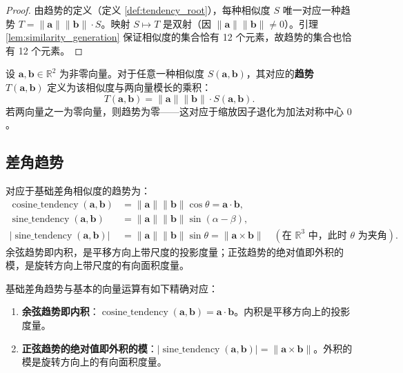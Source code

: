 \begin{proof}
由趋势的定义（定义 \ref{def:tendency_root}），每种相似度 $S$ 唯一对应一种趋势 $T = \|\mathbf{a}\|\|\mathbf{b}\| \cdot S$。映射 $S \mapsto T$ 是双射（因 $\|\mathbf{a}\|\|\mathbf{b}\| \neq 0$）。引理 \ref{lem:similarity_generation} 保证相似度的集合恰有 12 个元素，故趋势的集合也恰有 12 个元素。
\end{proof}

\begin{definition}[趋势]\label{def:tendency}
设 $\mathbf{a}, \mathbf{b} \in \mathbb{R}^2$ 为非零向量。对于任意一种相似度 $S(\mathbf{a}, \mathbf{b})$，其对应的\textbf{趋势} $T(\mathbf{a}, \mathbf{b})$ 定义为该相似度与两向量模长的乘积：
\[
T(\mathbf{a}, \mathbf{b}) = \|\mathbf{a}\| \|\mathbf{b}\| \cdot S(\mathbf{a}, \mathbf{b}).
\]
若两向量之一为零向量，则趋势为零——这对应于缩放因子退化为加法对称中心 $0$。
\end{definition}

\subsection{\texorpdfstring{差角趋势}{差角趋势}}

\begin{definition}[基础差角趋势]\label{def:basic_diff_tendency}
对应于基础差角相似度的趋势为：
\begin{align*}
\operatorname{cosine\_tendency}(\mathbf{a}, \mathbf{b}) &= \|\mathbf{a}\| \|\mathbf{b}\| \cos\theta = \mathbf{a} \cdot \mathbf{b}, \\
\operatorname{sine\_tendency}(\mathbf{a}, \mathbf{b}) &= \|\mathbf{a}\| \|\mathbf{b}\| \sin(\alpha-\beta), \\
\lvert\operatorname{sine\_tendency}(\mathbf{a}, \mathbf{b})\rvert &= \|\mathbf{a}\| \|\mathbf{b}\| \sin\theta = \|\mathbf{a} \times \mathbf{b}\| \quad (\text{在 } \mathbb{R}^3 \text{ 中，此时 } \theta \text{ 为夹角}).
\end{align*}
余弦趋势即内积，是平移方向上带尺度的投影度量；正弦趋势的绝对值即外积的模，是旋转方向上带尺度的有向面积度量。
\end{definition}

\begin{proposition}[基础差角趋势与向量运算的对应]\label{prop:diff_tendency_relations}
基础差角趋势与基本的向量运算有如下精确对应：
\begin{enumerate}[label=(\roman*)]
    \item \textbf{余弦趋势即内积}：$\operatorname{cosine\_tendency}(\mathbf{a}, \mathbf{b}) = \mathbf{a} \cdot \mathbf{b}$。内积是平移方向上的投影度量。
    \item \textbf{正弦趋势的绝对值即外积的模}：$\lvert\operatorname{sine\_tendency}(\mathbf{a}, \mathbf{b})\rvert = \|\mathbf{a} \times \mathbf{b}\|$。外积的模是旋转方向上的有向面积度量。
\end{enumerate}
\end{proposition}

